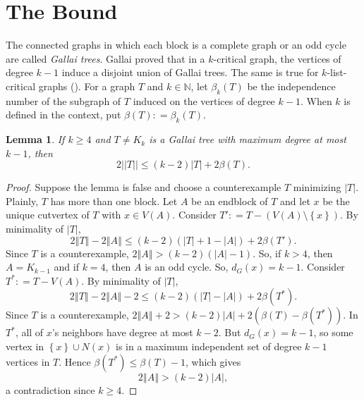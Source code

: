 \documentclass[12pt]{article}
\theoremstyle{plain}
\newtheorem{lem}[thm]{Lemma}
\theoremstyle{definition}
\theoremstyle{remark}
\newcommand{\IN}{\mathbb{N}}
\newcommand{\set}[1]{\left\{ #1 \right\}}
\newcommand{\card}[1]{\left|#1\right|}
\newcommand{\size}[1]{\left\Vert#1\right\Vert}
\newcommand{\DefinedAs}{\mathrel{\mathop:}=}
\begin{document}
\section{The Bound}
The connected graphs in which each block is a complete graph
or an odd cycle are called \emph{Gallai trees}.  Gallai \cite{gallai1963kritische} proved that in a $k$-critical graph, the vertices of degree $k-1$ induce a disjoint union of Gallai trees.  The same is true for $k$-list-critical graphs (\cite{borodin1977criterion, erdos1979choosability}).  For a graph $T$ and $k \in \IN$, let $\beta_k(T)$ be the independence number of the subgraph of $T$ induced on the vertices of degree $k-1$.  When $k$ is defined in the context, put $\beta(T) 
\DefinedAs \beta_k(T)$.  

\begin{lem}\label{SimpleGallaiBetaBound}
	If $k \ge 4$ and $T \ne K_k$ is a Gallai tree with maximum degree at most $k-1$, then
	\[2||T|| \le (k-2)|T| + 2\beta(T).\]
\end{lem}
\begin{proof}
	Suppose the lemma is false and choose a counterexample $T$ minimizing $\card{T}$.  Plainly, $T$ has more than one block.  Let $A$ be an endblock of $T$ and let $x$ be the unique cutvertex of $T$ with $x \in V(A)$.
	Consider $T' \DefinedAs T - (V(A)\setminus\set{x})$.  By minimality of $\card{T}$,
	\begin{equation*}
		2\size{T} - 2\size{A} \le (k-2)(\card{T} + 1 - \card{A}) + 2\beta(T').
	\end{equation*}
		Since $T$ is a counterexample, $2\size{A} > (k-2)(\card{A} - 1)$.  So, if $k > 4$, then $A = K_{k-1}$ and if $k=4$, then $A$ is an odd cycle.  So, $d_G(x) = k-1$.
	Consider $T^* \DefinedAs T - V(A)$.  By minimality of $\card{T}$,
	\begin{equation*}
	2\size{T} - 2\size{A} - 2 \le (k-2)(\card{T} - \card{A}) + 2\beta(T^*).
	\end{equation*}
	Since $T$ is a counterexample, $2\size{A} + 2 > (k-2)\card{A} + 2(\beta(T) - \beta(T^*))$.  In $T^*$, all of $x$'s neighbors have degree at most $k-2$.
	But $d_G(x) = k-1$, so some vertex in $\set{x} \cup N(x)$ is in a maximum independent set of degree $k-1$ vertices in $T$.  Hence $\beta(T^*) \le \beta(T) - 1$, which gives
	\begin{equation*}
	 2\size{A} > (k-2)\card{A},
	\end{equation*}
	a contradiction since $k \ge 4$.
\end{proof}
\end{document}
